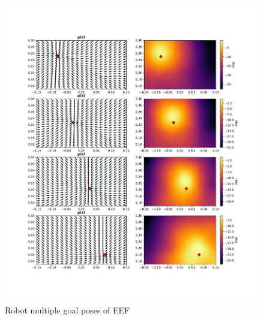 \begin{figure}[h]
    \centering
    \includegraphics[width=\textwidth]{res/multiple_goals_uarm.pdf}

    \caption{Robot multiple goal poses of EEF}
    \label{fig:uarm_moving_goal_policy}
    
\end{figure}

%
%    
